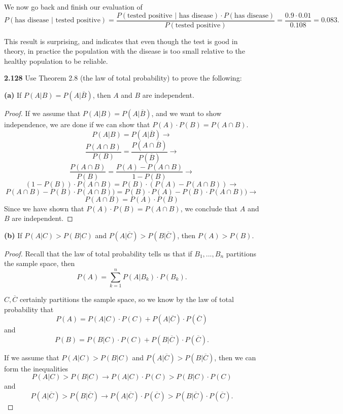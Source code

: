 \documentclass{exam}
\begin{document}
\begin{questions}
We now go back and finish our evaluation of
$$P(\text{has disease } | \text{ tested positive}) = \frac{P(\text{tested positive } | \text{ has disease}) \cdot P(\text{has disease})}{P(\text{tested positive})} = \frac{0.9 \cdot 0.01}{0.108} = 0.083.$$

This result is surprising, and indicates that even though the test is good in theory, in practice the population with the disease is too small relative to the healthy population to be reliable.

\newpage



\textbf{2.128 } Use Theorem 2.8 (the law of total probability) to prove the following:

\textbf{(a) } If $P(A | B) = P(A | \overline{B})$, then $A$ and $B$ are independent.
\begin{proof}
If we assume that $P(A | B) = P(A | \overline{B})$, and we want to show independence, we are done if we can show that $P(A) \cdot P(B) = P(A \cap B)$.
$$P(A | B) = P(A | \overline{B}) \rightarrow$$
$$\frac{P(A \cap B)}{P(B)} = \frac{P(A \cap \overline{B})}{P(\overline{B})} \rightarrow$$
$$\frac{P(A \cap B)}{P(B)} = \frac{P(A) - P(A \cap B)}{1 - P(B)} \rightarrow$$
$$(1 - P(B)) \cdot P(A \cap B) = P(B) \cdot (P(A) - P(A \cap B)) \rightarrow$$
$$P(A \cap B) - P(B) \cdot P(A \cap B)) = P(B) \cdot P(A) - P(B) \cdot P(A \cap B))\rightarrow$$
$$P(A \cap B) = P(A) \cdot P(B)$$
Since we have shown that $P(A) \cdot P(B) = P(A \cap B)$, we conclude that $A$ and $B$ are independent.
\end{proof}

\textbf{(b) } If $P(A | C) > P(B | C)$ and $P(A | \overline{C}) > P(B | \overline{C})$, then $P(A) > P(B)$.
\begin{proof}
Recall that the law of total probability tells us that if $B_1, ..., B_n$ partitions the sample space, then
$$P(A) = \sum_{k=1}^n P(A | B_k)\cdot P(B_k).$$

$C, \overline{C}$ certainly partitions the sample space, so we know by the law of total probability that
$$P(A) = P(A | C) \cdot P(C) + P(A | \overline{C}) \cdot P(\overline{C})$$
and
$$P(B) = P(B | C) \cdot P(C) + P(B | \overline{C}) \cdot P(\overline{C}).$$

If we assume that $P(A | C) > P(B | C)$ and $P(A | \overline{C}) > P(B | \overline{C})$, then we can form the inequalities
\begin{equation}
    P(A | C) > P(B | C) \longrightarrow P(A | C) \cdot P(C) > P(B | C) \cdot P(C)
\end{equation}
and
\begin{equation}
    P(A | \overline{C}) > P(B | \overline{C}) \longrightarrow P(A | \overline{C}) \cdot P(\overline{C}) > P(B | \overline{C}) \cdot P(\overline{C}).
\end{equation}


\end{proof}
\end{questions}
\end{document}

